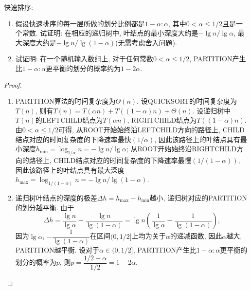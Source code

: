 \documentclass[10pt]{article}
\begin{document}
\begin{enumerate}
\begin{tcolorbox}[colback=red!20!white,breakable]
\begin{enumerate}
			\end{enumerate}
		\end{tcolorbox}
		\begin{tcolorbox}[colback=red!20!white,breakable]
			\begin{proof}
				\ 
				\begin{enumerate}
					\item PARTITION算法的时间复杂度为$\Theta(n)$. 设QUICKSORT的时间复杂度为$T(n)$, 则有$T(n)=T(\alpha n)+T((1-\alpha)n)+\Theta(n)$. 设递归树中$T(n)$的LEFTCHILD结点为$T(\alpha n)$, RIGHTCHILD结点为$T((1-\alpha)n)$. 由$0<\alpha\leqslant 1/2$可得, 从ROOT开始始终沿LEFTCHILD方向的路径上, CHILD结点对应的时间复杂度的下降速率最快$(1/\alpha)$, 因此该路径上的叶结点具有最小深度$h_{\min}=\log_{1/\alpha}n=-\lg n/\lg\alpha$; 从ROOT开始始终沿RIGHTCHILD方向的路径上, CHILD结点对应的时间复杂度的下降速率最慢$(1/(1-\alpha))$, 因此该路径上的叶结点具有最大深度$h_{\max}=\log_{1/(1-\alpha)}n=-\lg n/\lg(1-\alpha)$.
					\item 递归树叶结点的深度的极差$\Delta h=h_{\max}-h_{\min}$越小, 递归树对应的PARTITION的划分越平衡. 由于
					$$\Delta h=\frac{\lg n}{\lg\alpha}-\frac{\lg n}{\lg(1-\alpha)}=\lg n\left(\frac{1}{\lg\alpha}-\frac{1}{\lg(1-\alpha)}\right),$$
					因为$\lg\alpha$, $-\dfrac{1}{\lg(1-\alpha)}$在区间$(0,1/2]$上均为关于$\alpha$的递减函数, 因此$\alpha$越大, PARTITION越平衡. 设对于$\alpha\in(0,1/2]$, PARTITION产生比$1-\alpha:\alpha$更平衡的划分的概率为$p$, 则$p=\dfrac{1/2-\alpha}{1/2}=1-2\alpha$.
				\end{enumerate}
			\end{proof}
		\end{tcolorbox}
	\end{enumerate}
\end{document}

